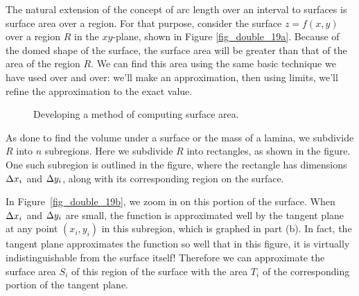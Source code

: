 The natural extension of the concept of arc length over an interval to surfaces is surface area over a region. For that purpose, consider the surface $z=f(x,y)$ over a region $R$ in the $xy$-plane, shown in Figure \ref{fig_double_19a}. Because of the domed shape of the surface, the surface area will be greater than that of the area of the region $R$. We can find this area using the same basic technique we have used over and over: we'll make an approximation, then using limits, we'll refine the approximation to the exact value.


\begin{figure}
\centering
\qquad
{}
\caption{Developing a method of computing surface area.}
\end{figure}



As done to find the volume under a surface or the mass of a lamina, we subdivide $R$ into $n$ subregions. Here we subdivide $R$ into rectangles, as shown in the figure. One such subregion is outlined in the figure, where the rectangle has dimensions $\Delta x_i$ and $\Delta y_i$, along with its corresponding region on the surface.

In Figure~\ref{fig_double_19b}, we zoom in on this portion of the surface. When $\Delta x_i$ and $\Delta y_i$ are small, the function is approximated well by the tangent plane at any point $(x_i,y_i)$ in this subregion, which is graphed in part (b). In fact, the tangent plane approximates the function so well that in this figure, it is virtually indistinguishable from the surface itself! Therefore we can approximate the surface area $S_i$ of this region of the surface with the area $T_i$ of the corresponding portion of the tangent plane.

